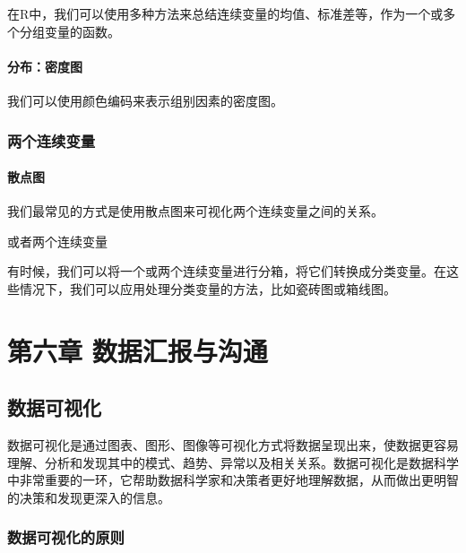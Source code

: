 \documentclass[]{book}
\begin{document}
在R中，我们可以使用多种方法来总结连续变量的均值、标准差等，作为一个或多个分组变量的函数。

\hypertarget{ux5206ux5e03ux5bc6ux5ea6ux56fe}{%
\subsubsection{分布：密度图}\label{ux5206ux5e03ux5bc6ux5ea6ux56fe}}

我们可以使用颜色编码来表示组别因素的密度图。

\hypertarget{ux4e24ux4e2aux8fdeux7eedux53d8ux91cf}{%
\subsection{两个连续变量}\label{ux4e24ux4e2aux8fdeux7eedux53d8ux91cf}}

\hypertarget{ux6563ux70b9ux56fe}{%
\subsubsection{散点图}\label{ux6563ux70b9ux56fe}}

我们最常见的方式是使用散点图来可视化两个连续变量之间的关系。

或者两个连续变量

有时候，我们可以将一个或两个连续变量进行分箱，将它们转换成分类变量。在这些情况下，我们可以应用处理分类变量的方法，比如瓷砖图或箱线图。

\hypertarget{ux7b2cux516dux7ae0-ux6570ux636eux6c47ux62a5ux4e0eux6c9fux901a}{%
\chapter{第六章 数据汇报与沟通}\label{ux7b2cux516dux7ae0-ux6570ux636eux6c47ux62a5ux4e0eux6c9fux901a}}

\hypertarget{ux6570ux636eux53efux89c6ux5316}{%
\section{数据可视化}\label{ux6570ux636eux53efux89c6ux5316}}

数据可视化是通过图表、图形、图像等可视化方式将数据呈现出来，使数据更容易理解、分析和发现其中的模式、趋势、异常以及相关关系。数据可视化是数据科学中非常重要的一环，它帮助数据科学家和决策者更好地理解数据，从而做出更明智的决策和发现更深入的信息。

\hypertarget{ux6570ux636eux53efux89c6ux5316ux7684ux539fux5219}{%
\subsection{数据可视化的原则}\label{ux6570ux636eux53efux89c6ux5316ux7684ux539fux5219}}
\end{document}
